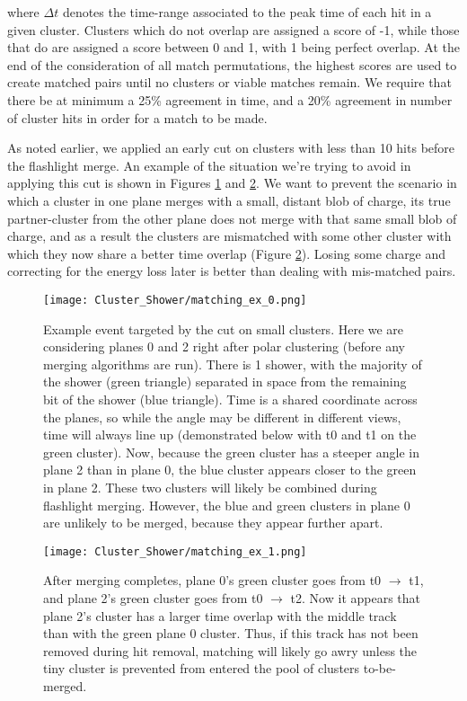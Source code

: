 \noindent where $\Delta t$ denotes the time-range associated to the peak time of each hit in a given cluster.  Clusters which do not overlap are assigned a score of -1, while those that do are assigned a score between 0 and 1, with 1 being perfect overlap. At the end of the consideration of all match permutations, the highest scores are used to create matched pairs until no clusters or viable matches remain. We require that there be at minimum a 25\% agreement in time, and a 20\% agreement in number of cluster hits in order for a match to be made. 
\par As noted earlier, we applied an early cut on clusters with less than 10 hits before the flashlight merge. An example of the situation we're trying to avoid in applying this cut is shown in Figures \ref{fig:matching_ex_0} and \ref{fig:matching_ex_1}.  We want to prevent the scenario in which a cluster in one plane merges with a small, distant blob of charge, its true partner-cluster from the other plane does not merge with that same small blob of charge, and as a result the clusters are mismatched with some other cluster with which they now share a better time overlap (Figure \ref{fig:matching_ex_1}). Losing some charge and correcting for the energy loss later is better than dealing with mis-matched pairs.

\begin{figure}[H]
\centering
\texttt{[image: Cluster\_Shower/matching\_ex\_0.png]}
\caption{Example event targeted by the cut on small clusters. Here we are considering planes 0 and 2 right after polar clustering (before any merging algorithms are run).  There is 1 shower, with the majority of the shower (green triangle) separated in space from the remaining bit of the shower (blue triangle).  Time is a shared coordinate across the planes, so while the angle may be different in different views, time will always line up (demonstrated below with t0 and t1 on the green cluster).  Now, because the green cluster has a steeper angle in plane 2 than in plane 0, the blue cluster appears closer to the green in plane 2.  These two clusters will likely be combined during flashlight merging.  However, the blue and green clusters in plane 0 are unlikely to be merged,  because they appear further apart. }
\label{fig:matching_ex_0}
\end{figure}

\begin{figure}[H]
\centering
\texttt{[image: Cluster\_Shower/matching\_ex\_1.png]}
\caption{After merging completes, plane 0’s green cluster goes from t0 $\rightarrow$ t1, and plane 2’s green cluster goes from t0 $\rightarrow$ t2. Now it appears that plane 2’s cluster has a larger time overlap with the middle track than with the green plane 0 cluster.  Thus, if this track has not been removed during hit removal, matching will likely go awry unless the tiny cluster is prevented from entered the pool of clusters to-be-merged.
 }
\label{fig:matching_ex_1}
\end{figure}


